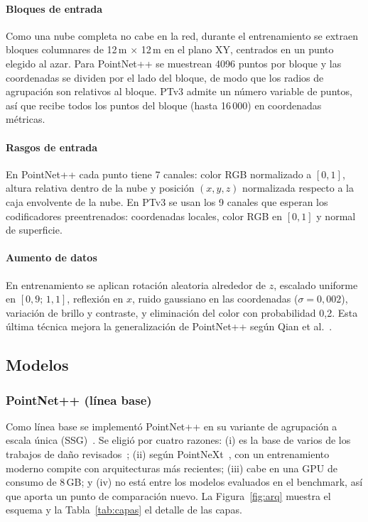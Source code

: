 \documentclass[5p]{elsarticle}
\begin{document}
\paragraph{Bloques de entrada} Como una nube completa no cabe en la red, durante el entrenamiento se extraen bloques columnares de 12\,m $\times$ 12\,m en el plano XY, centrados en un punto elegido al azar. Para PointNet++ se muestrean 4096 puntos por bloque y las coordenadas se dividen por el lado del bloque, de modo que los radios de agrupación son relativos al bloque. PTv3 admite un número variable de puntos, así que recibe todos los puntos del bloque (hasta 16\,000) en coordenadas métricas.

\paragraph{Rasgos de entrada} En PointNet++ cada punto tiene 7 canales: color RGB normalizado a $[0,1]$, altura relativa dentro de la nube y posición $(x,y,z)$ normalizada respecto a la caja envolvente de la nube. En PTv3 se usan los 9 canales que esperan los codificadores preentrenados: coordenadas locales, color RGB en $[0,1]$ y normal de superficie.

\paragraph{Aumento de datos} En entrenamiento se aplican rotación aleatoria alrededor de $z$, escalado uniforme en $[0{,}9;\,1{,}1]$, reflexión en $x$, ruido gaussiano en las coordenadas ($\sigma=0{,}002$), variación de brillo y contraste, y eliminación del color con probabilidad 0,2. Esta última técnica mejora la generalización de PointNet++ según Qian et al.~\cite{Qian2022}.

\subsection{Modelos}\label{sec:modelos}

\subsubsection{PointNet++ (línea base)}

Como línea base se implementó PointNet++ en su variante de agrupación a escala única (SSG)~\cite{Qi2017b}. Se eligió por cuatro razones: (i) es la base de varios de los trabajos de daño revisados~\cite{Lou2025,Bolourian2023,Fan2024}; (ii) según PointNeXt~\cite{Qian2022}, con un entrenamiento moderno compite con arquitecturas más recientes; (iii) cabe en una GPU de consumo de 8\,GB; y (iv) no está entre los modelos evaluados en el benchmark, así que aporta un punto de comparación nuevo. La Figura~\ref{fig:arq} muestra el esquema y la Tabla~\ref{tab:capas} el detalle de las capas.
\end{document}

